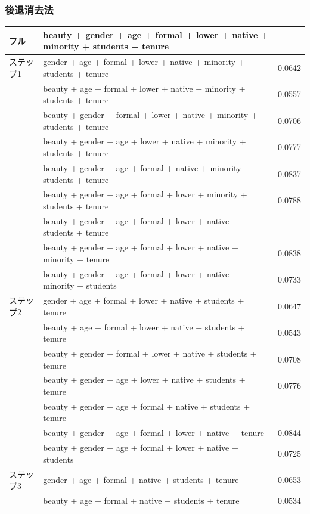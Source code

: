 \begin{frame}[shrink]
\frametitle{後退消去法}

\vspace{-0.3cm}

{\tiny
\begin{tabular}{l | l | c}
フル		& beauty + gender + age + formal + lower + native + minority + students + tenure & \orange{0.0839} \\
\hline
ステップ1 	& gender + age + formal + lower + native + minority + students + tenure		& 0.0642 \\
		& beauty + age + formal + lower + native + minority + students + tenure		& 0.0557 \\
		& beauty + gender + formal + lower + native + minority + students + tenure	& 0.0706 \\
		& beauty + gender + age + lower + native + minority + students + tenure		& 0.0777 \\
		& beauty + gender + age + formal + native + minority + students + tenure		& 0.0837 \\
		& beauty + gender + age + formal + lower + minority + students + tenure		& 0.0788 \\
		& beauty + gender + age + formal + lower + native + students + tenure		& \orange{0.0842} \\
		& beauty + gender + age + formal + lower + native + minority + tenure		& 0.0838 \\
		& beauty + gender + age + formal + lower + native + minority + students		& 0.0733 \\
\hline
ステップ2	& gender + age + formal + lower + native + students + tenure 				& 0.0647 \\
		& beauty + age + formal + lower + native + students + tenure 				& 0.0543 \\
		& beauty + gender + formal + lower + native + students + tenure 			& 0.0708 \\
		& beauty + gender + age + lower + native + students + tenure 				&0.0776  \\
		& beauty + gender + age + formal + native + students + tenure 			& \orange{0.0846} \\
		& beauty + gender + age + formal + lower + native + tenure 				& 0.0844 \\
		& beauty + gender + age + formal + lower + native + students 				& 0.0725 \\
\hline
ステップ3	& gender + age + formal + native + students + tenure 					& 0.0653 \\
		& beauty + age + formal + native + students + tenure					& 0.0534 \\

\end{tabular}}
\end{frame}
